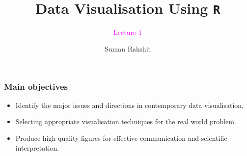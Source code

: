 \documentclass{beamer}
\title[]{Data Visualisation Using \texttt{R}}
\subtitle{\textcolor{magenta}{Lecture-1}}
\author[]{Suman Rakshit} %
\institute[School of EECMS, Curtin University] %
{
	\textcolor{magenta}{School of EECMS, Curtin University} %
}
\begin{document}
\begin{frame}
	\titlepage %
\end{frame}







\begin{frame}[t]\frametitle{Main objectives}\vspace{5pt}
\begin{itemize}
\item Identify the major issues and directions in contemporary data visualisation.
\vspace{0.5in}
\item<2-> Selecting appropriate visualisation techniques for the real world problem.
\vspace{0.5in}
\item<3-> Produce high quality figures for effective communication and scientific interpretation.
\end{itemize}
\end{frame}

%
%
%
\end{document}
